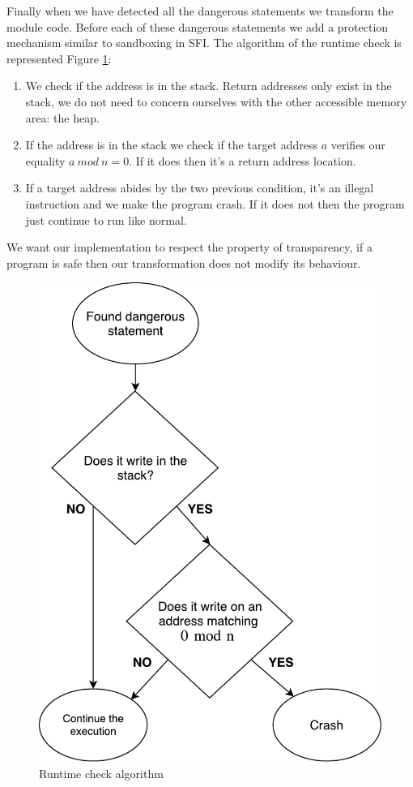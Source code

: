 \documentclass[11pt]{sdm}
\begin{document}
Finally when we have detected all the dangerous statements we transform the module code. Before each of these dangerous statements we add a protection mechanism similar to sandboxing in SFI. The algorithm of the runtime check is represented Figure \ref{runtime_check}: \\
	\begin{enumerate}
		\item We check if the address is in the stack. Return addresses only exist in the stack, we do not need to concern ourselves with the other accessible memory area: the heap.
		\item If the address is in the stack we check if the target address $a$ verifies our equality $a~mod~n=0$. If it does then it's a return address location.
		\item If a target address abides by the two previous condition, it's an illegal instruction and we make the program crash. If it does not then the program just continue to run like normal.
	\end{enumerate}
We want our implementation to respect the property of transparency, if a program is safe then our transformation does not modify its behaviour.

\begin{figure}[!ht]
\centering
\includegraphics[scale=0.6]{images/runtime_check.pdf}
\caption{Runtime check algorithm}
\label{runtime_check}
\end{figure}
\end{document}
